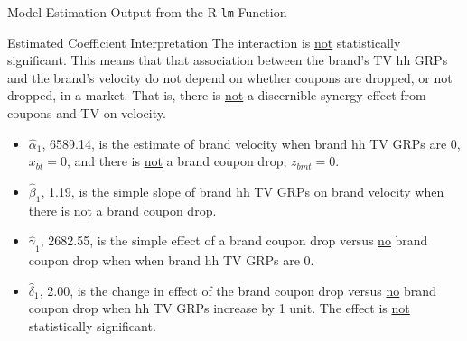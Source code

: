 \documentclass[pdf]{beamer}
\theoremstyle{remark}
\theoremstyle{definition}
\begin{document}
\begin{frame}[t]{Model Estimation Output from the \textsf{R} \texttt{lm} Function}
\footnotesize

\end{frame}

\begin{frame}[t]{Estimated Coefficient Interpretation}
\small
The interaction is \underline{not} statistically significant. This  means that that association between the brand's TV hh GRPs and the brand's velocity do not depend on whether coupons are dropped, or not dropped, in a market.  That is, there is \underline{not} a discernible synergy effect from coupons and TV on velocity. \\
\vspace{0.5ex}
\begin{itemize}
\item $\hat{\alpha}_1$, 6589.14, is the estimate of brand velocity when brand hh TV GRPs are 0, $x_{bt} =0$, and there is \underline{not} a brand coupon drop, $z_{bmt} =0$.\\
\vspace{1.5ex}
\item $\hat{\beta}_1$, 1.19, is the simple slope of brand hh TV GRPs on brand velocity when there is \underline{not} a brand coupon drop. \\
\vspace{1.5ex}
\item $\hat{\gamma}_1$, 2682.55, is the simple effect of a brand coupon drop versus \underline{no} brand coupon drop when when brand hh TV GRPs are 0. \\
\vspace{1.5ex}
\item $\hat{\delta}_1$, 2.00, is the change in effect of the brand coupon drop versus \underline{no} brand coupon drop when hh TV GRPs increase by 1 unit.  The effect is \underline{not} statistically significant.
\end{itemize}
\end{frame}
\end{document}
